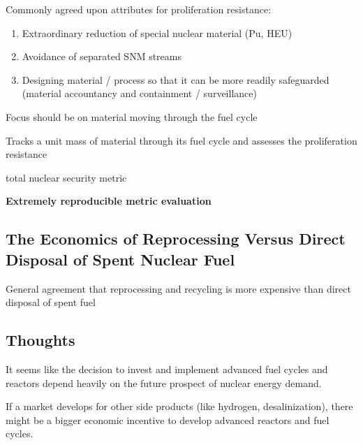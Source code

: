 Commonly agreed upon attributes for proliferation resistance:
\begin{enumerate}
    \item Extraordinary reduction of special nuclear material (Pu, HEU)
    \item Avoidance of separated SNM streams
    \item Designing material / process so that it can be more readily safeguarded (material accountancy and containment / surveillance)
\end{enumerate}

Focus should be on material moving through the fuel cycle

Tracks a unit mass of material through its fuel cycle and assesses the proliferation resistance

total nuclear security metric

\textbf{Extremely reproducible metric evaluation}


\subsection{The Economics of Reprocessing Versus Direct Disposal of Spent Nuclear Fuel}
\cite{bunn_economcis_2004}

General agreement that reprocessing and recycling is more expensive than direct
disposal of spent fuel \cite{charpin_economic_2000}


\subsection{Thoughts}

It seems like the decision to invest and implement advanced fuel cycles and 
reactors depend heavily on the future prospect of nuclear energy demand.

If a market develops for other side products (like hydrogen, desalinization),
there might be a bigger economic incentive to develop advanced reactors and 
fuel cycles.


